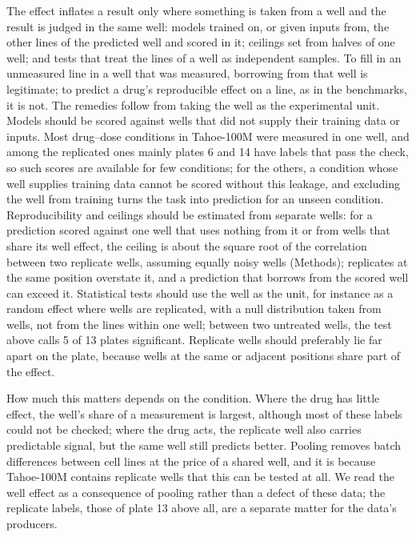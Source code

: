 \documentclass[pdflatex,sn-nature]{sn-jnl}
\begin{document}
The effect inflates a result only where something is taken from a well and the result is judged in the same well: models trained on, or given inputs from, the other lines of the predicted well and scored in it; ceilings set from halves of one well; and tests that treat the lines of a well as independent samples. To fill in an unmeasured line in a well that was measured, borrowing from that well is legitimate; to predict a drug's reproducible effect on a line, as in the benchmarks, it is not. The remedies follow from taking the well as the experimental unit. Models should be scored against wells that did not supply their training data or inputs. Most drug--dose conditions in Tahoe-100M were measured in one well, and among the replicated ones mainly plates 6 and 14 have labels that pass the check, so such scores are available for few conditions; for the others, a condition whose well supplies training data cannot be scored without this leakage, and excluding the well from training turns the task into prediction for an unseen condition. Reproducibility and ceilings should be estimated from separate wells: for a prediction scored against one well that uses nothing from it or from wells that share its well effect, the ceiling is about the square root of the correlation between two replicate wells, assuming equally noisy wells (Methods); replicates at the same position overstate it, and a prediction that borrows from the scored well can exceed it. Statistical tests should use the well as the unit, for instance as a random effect where wells are replicated, with a null distribution taken from wells, not from the lines within one well; between two untreated wells, the test above calls 5 of 13 plates significant. Replicate wells should preferably lie far apart on the plate, because wells at the same or adjacent positions share part of the effect.

How much this matters depends on the condition. Where the drug has little effect, the well's share of a measurement is largest, although most of these labels could not be checked; where the drug acts, the replicate well also carries predictable signal, but the same well still predicts better. Pooling removes batch differences between cell lines at the price of a shared well, and it is because Tahoe-100M contains replicate wells that this can be tested at all. We read the well effect as a consequence of pooling rather than a defect of these data; the replicate labels, those of plate 13 above all, are a separate matter for the data's producers.
\end{document}
